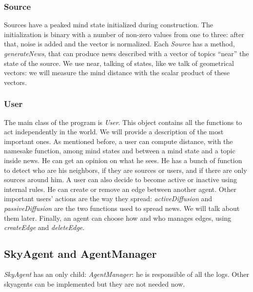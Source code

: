 \subsubsection{Source}
Sources have a peaked mind state initialized during construction.
The initialization is binary with a number of non-zero values from one to three:
after that, noise is added and the vector is normalized.
Each \textit{Source} has a method, \textit{generateNews}, that can produce
news described with a vector of topics ``near'' the state of the source.
We use near, talking of states, like we talk of geometrical vectors: we will
measure the mind distance with the scalar product of these vectors.

\subsubsection{User}
The main class of the program is \textit{User}.
This object contains all the functions to act independently in the world.
We will provide a description of the most important ones.
As mentioned before, a user can compute distance, with the namesake
function, among mind states and between a mind state and a
topic inside news. He can get an opinion on what he sees.
He has a bunch of function to detect who are his neighbors, if they
are sources or users, and if there are only sources around him.
A user can also decide to become active or inactive using internal rules.
He can create or remove an edge between another agent.
Other important users' actions are the way they spread:
\textit{activeDiffusion} and \textit{passiveDiffusion} are the
two functions used to spread news. We will talk about them later.
Finally, an agent can choose how and who manages edges, using
\textit{createEdge} and \textit{deleteEdge}.

\subsection{SkyAgent and AgentManager}
\textit{SkyAgent} has an only child: \textit{AgentManager}: he is
responsible of all the logs.
Other skyagents can be implemented but they are not needed now.

